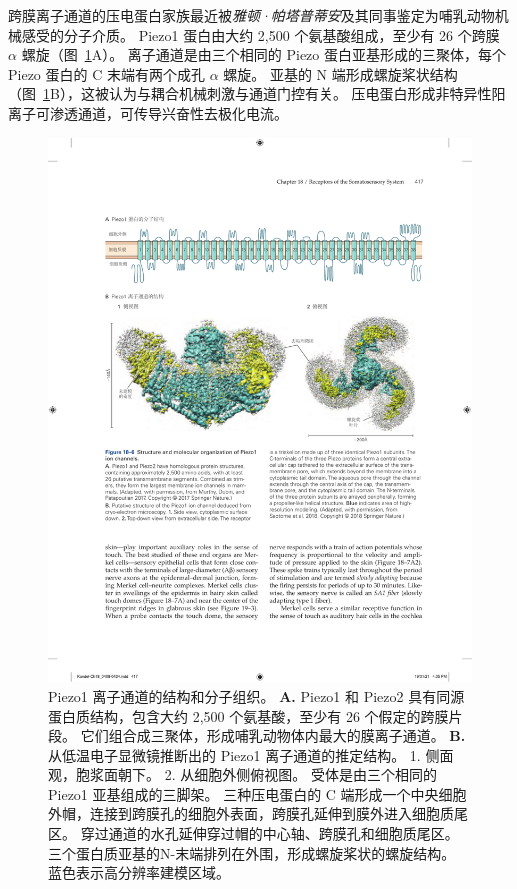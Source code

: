 跨膜离子通道的压电蛋白家族最近被\textit{雅顿·帕塔普蒂安}及其同事鉴定为哺乳动物机械感受的分子介质。
Piezo1 蛋白由大约 2,500 个氨基酸组成，至少有 26 个跨膜 $\alpha$ 螺旋（图~\ref{fig:18_6}A）。
离子通道是由三个相同的 Piezo 蛋白亚基形成的三聚体，每个 Piezo 蛋白的 C 末端有两个成孔 $\alpha$ 螺旋。
亚基的 N 端形成螺旋桨状结构（图~\ref{fig:18_6}B），这被认为与耦合机械刺激与通道门控有关。
压电蛋白形成非特异性阳离子可渗透通道，可传导兴奋性去极化电流。


\begin{figure}[htbp]
	\centering
	\includegraphics[width=1.0\linewidth]{chap18/fig_18_6}
	\caption{Piezo1 离子通道的结构和分子组织。
		\textbf{A.} Piezo1 和 Piezo2 具有同源蛋白质结构，包含大约 2,500 个氨基酸，至少有 26 个假定的跨膜片段。
		它们组合成三聚体，形成哺乳动物体内最大的膜离子通道\cite{murthy2017piezos}。
		\textbf{B.} 从低温电子显微镜推断出的 Piezo1 离子通道的推定结构。
		1. 侧面观，胞浆面朝下。
		2. 从细胞外侧俯视图。
		受体是由三个相同的 Piezo1 亚基组成的三脚架。
		三种压电蛋白的 C 端形成一个中央细胞外帽，连接到跨膜孔的细胞外表面，跨膜孔延伸到膜外进入细胞质尾区。
		穿过通道的水孔延伸穿过帽的中心轴、跨膜孔和细胞质尾区。
		三个蛋白质亚基的N-末端排列在外围，形成螺旋桨状的螺旋结构。 
		蓝色表示高分辨率建模区域\cite{saotome2018structure}。}
	\label{fig:18_6}
\end{figure}



